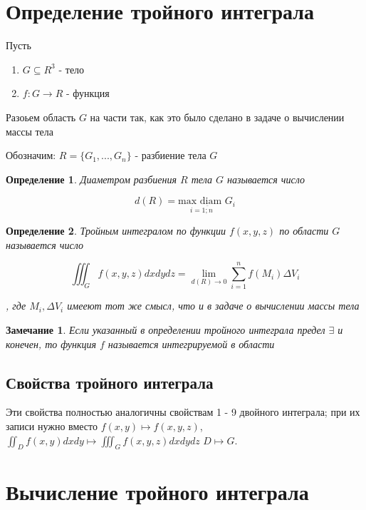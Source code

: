 \documentclass[a4paper, 14pt]{report}
\newtheorem{defenition}{Определение}[chapter]
\newtheorem{note}{Замечание}[chapter]
\begin{document}
\section{Определение тройного интеграла}

Пусть 

\begin{enumerate}
    \item $G \subseteq R^3$ - тело
    \item $f:G \to R$ - функция
\end{enumerate}

Разоьем область $G$ на части так, как это было сделано в задаче о вычислении массы тела

Обозначим: $R = \{G_1,...,G_n\}$ - разбиение тела $G$

\begin{defenition}
    Диаметром разбиения $R$ тела $G$ называется число

    $$
    d(R) = \underset{i = \overline{1;n}}{\text{max diam }} G_i
    $$
\end{defenition}

\begin{defenition}
    Тройным интегралом по функции $f(x,y,z)$ по области $G$ называется число 

    $$
    \iiint_G f(x,y,z) dxdydz = \lim_{d(R) \to 0} \sum_{i=1}^n f(M_i) \Delta V_i
    $$

    , где $M_i, \Delta V_i$ имееют тот же смысл, что и в задаче о вычислении массы тела
\end{defenition}

\begin{note}
    Если указанный в определении тройного интеграла предел $\exists$ и конечен, то функция $f$ называется интегрируемой в области 
\end{note}

\subsection{Свойства тройного интеграла}

Эти свойства полностью аналогичны свойствам 1 - 9 двойного интеграла; при их записи нужно вместо $f(x,y) \mapsto f(x,y,z)$, $\iint_D f(x,y) dxdy \mapsto \iiint_G f(x,y,z) dxdydz$ $D \mapsto G$.

\section{Вычисление тройного интеграла}
\end{document}
